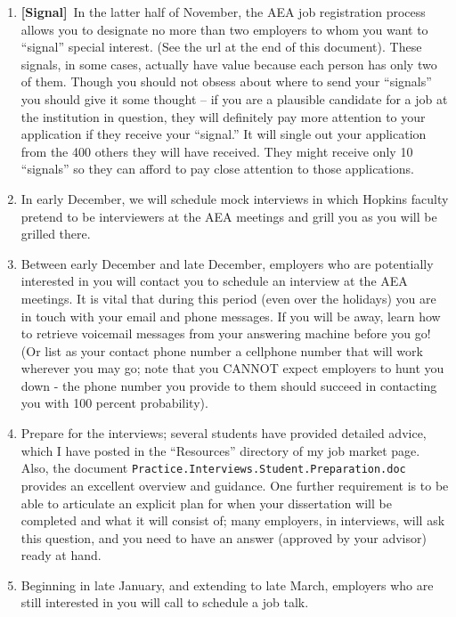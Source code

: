 \documentclass{econtex}
\begin{document}
\begin{enumerate}
\item \ifdvi\hypertarget{Signal}{{\bf [Signal]}~}\fi In the latter half of November, the AEA job registration process 
  allows you to designate no more than two employers to whom you want
  to ``signal'' special interest.  (See the url at the end of this
  document).  These signals, in some cases, actually have value because 
each person has only two of them.  Though you should not obsess about 
where to send your ``signals'' you should give it some thought -- if you
are a plausible candidate for a job at the institution in question, they
will definitely pay more attention to your application if they receive your 
``signal.''  It will single out your application from the 400 others they will have received.
They might receive only 10 ``signals'' so they can afford to pay close attention
to those applications.
  
\item In early December, we will schedule mock interviews in which
  Hopkins faculty pretend to be interviewers at the AEA meetings and
  grill you as you will be grilled there.
  
\item Between early December and late December, employers who are
  potentially interested in you will contact you to schedule an
  interview at the AEA meetings.  It is vital that during this period
  (even over the holidays) you are in touch with your email and phone
  messages.  If you will be away, learn how to retrieve voicemail
  messages from your answering machine before you go!  (Or list as
  your contact phone number a cellphone number that will work wherever
  you may go; note that you CANNOT expect employers to hunt you down -
  the phone number you provide to them should succeed in contacting
  you with 100 percent probability).
  
\item Prepare for the interviews; several students have provided
  detailed advice, which I have posted in the ``Resources'' directory
  of my job market page.  Also, the document
  \texttt{Practice.Interviews.Student.Preparation.doc} provides an
  excellent overview and guidance. One further requirement is to be
  able to articulate an explicit plan for when your dissertation will
  be completed and what it will consist of; many employers, in
  interviews, will ask this question, and you need to have an answer
  (approved by your advisor) ready at hand. \ifdvi\hypertarget{InterviewPrep}{}\fi
  
\item Beginning in late January, and extending to late March,
  employers who are still interested in you will call to schedule a
  job talk.
  

\end{enumerate}
\end{document}
